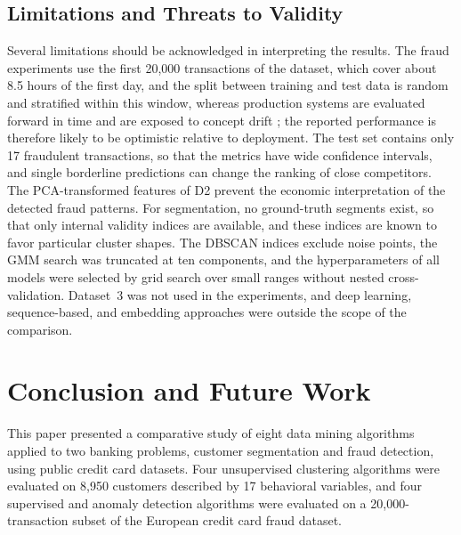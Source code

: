 \documentclass[conference]{IEEEtran}
\begin{document}
\subsection{Limitations and Threats to Validity}

Several limitations should be acknowledged in interpreting the results. The fraud experiments use the first 20,000 transactions of the dataset, which cover about 8.5 hours of the first day, and the split between training and test data is random and stratified within this window, whereas production systems are evaluated forward in time and are exposed to concept drift \cite{carcillo2018beyond}; the reported performance is therefore likely to be optimistic relative to deployment. The test set contains only 17 fraudulent transactions, so that the metrics have wide confidence intervals, and single borderline predictions can change the ranking of close competitors. The PCA-transformed features of D2 prevent the economic interpretation of the detected fraud patterns. For segmentation, no ground-truth segments exist, so that only internal validity indices are available, and these indices are known to favor particular cluster shapes. The DBSCAN indices exclude noise points, the GMM search was truncated at ten components, and the hyperparameters of all models were selected by grid search over small ranges without nested cross-validation. Dataset~3 was not used in the experiments, and deep learning, sequence-based, and embedding approaches \cite{barkhordar2021,mousaeirad2020} were outside the scope of the comparison.

\section{Conclusion and Future Work}
\label{sec:conclusion}

This paper presented a comparative study of eight data mining algorithms applied to two banking problems, customer segmentation and fraud detection, using public credit card datasets. Four unsupervised clustering algorithms were evaluated on 8,950 customers described by 17 behavioral variables, and four supervised and anomaly detection algorithms were evaluated on a 20,000-transaction subset of the European credit card fraud dataset.
\end{document}

